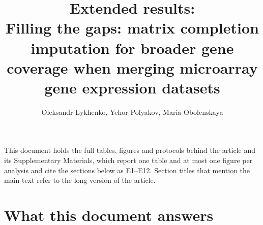 \documentclass[11pt,a4paper]{article}
\title{Extended results:\\
  Filling the gaps: matrix completion imputation for broader
  gene coverage when merging microarray gene expression datasets}
\author{Oleksandr Lykhenko, Yehor Polyakov, Maria Obolenskaya}
\date{}
\begin{document}
\maketitle

\tableofcontents

\noindent This document holds the full tables, figures and protocols
behind the article and its Supplementary Materials, which report
one table and at most one figure per analysis and cite the
sections below as E1--E12. Section titles that mention the main
text refer to the long version of the article.

\section*{What this document answers}
\end{document}
